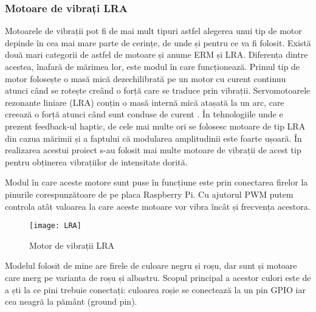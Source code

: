 \documentclass[../IoMusT.tex]{subfiles}
\begin{document}
\subsubsection{Motoare de vibrați LRA}
Motoarele de vibrații pot fi de mai mult tipuri astfel alegerea unui tip de motor depinde în cea mai mare parte de cerințe, de unde și pentru ce va fi folosit. Există două mari categorii de astfel de motoare și anume ERM și LRA. Diferența dintre acestea, înafară de mărimea lor, este modul în care funcționează. Primul tip de motor folosește o masă mică dezechilibrată pe un motor cu curent continuu atunci când se rotește creând o forță care se traduce prin vibrații. Servomotoarele rezonante liniare (LRA) conțin o masă internă mică atașată la un arc, care creează o forță atunci când sunt conduse de curent \cite{LRA}. În tehnologiile unde e prezent feedback-ul haptic, de cele mai multe ori se folosesc motoare de tip LRA din cazua mărimii și a faptului că modularea amplitudinii este foarte ușoară. În realizarea acestui proiect s-au folosit mai multe motoare de vibrații de acest tip pentru obținerea vibrațiilor de intensitate dorită.
\\
\par Modul în care aceste motore sunt puse în funcțiune este prin conectarea firelor la pinurile corespunzătoare de pe placa Raspberry Pi. Cu ajutorul PWM putem controla atât valoarea la care aceste motoare vor vibra încât și frecvența acestora.
\begin{figure}[h]
\centering
\texttt{[image: LRA]}
\caption{Motor de vibrații LRA}
\end{figure}
Modelul folosit de mine are firele de culoare negru și roșu, dar sunt și motoare care merg pe varianta de roșu și albastru. Scopul principal a acestor culori este de a ști la ce pini trebuie conectați: culoarea roșie se conectează la un pin GPIO iar cea neagră la pământ (ground pin).
\end{document}
